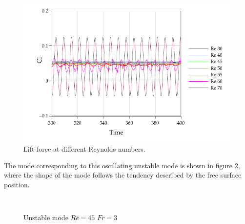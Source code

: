 \documentclass[%
 reprint,
 amsmath,amssymb,
 aps,
prl
]{revtex4-1}
\begin{document}
\begin{figure}
  \begin{center}
  \includegraphics[width=\columnwidth]{Cl_Fr3_0.pdf}
  \end{center}
  \caption{Lift force at different Reynolds numbers.}
  \label{f:lifts}
\end{figure}

The mode corresponding to this oscillating unstable mode is shown in figure \ref{f:mode}, where the shape of the mode follows the tendency described by the free surface position. 

\begin{figure}[ht]
  \centering
     \\
  \caption{Unstable mode $Re=45$ $Fr=3$}
  \label{f:mode}
\end{figure}
\end{document}
